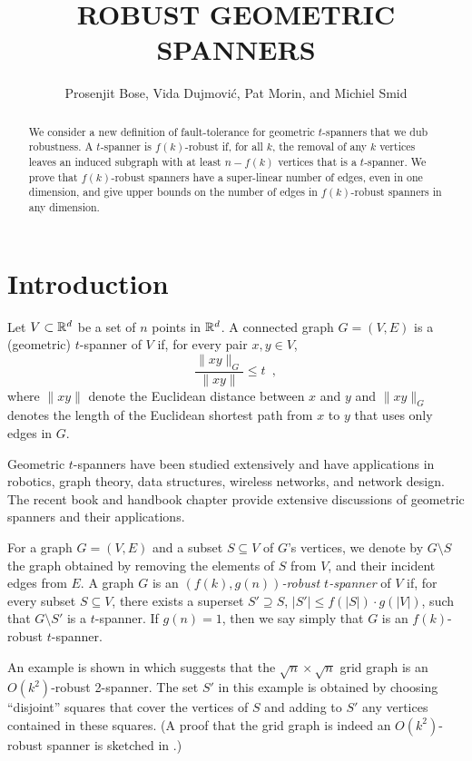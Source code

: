 \documentclass{patmorin}
\title{\MakeUppercase{Robust Geometric Spanners}}
\author{Prosenjit Bose, Vida Dujmovi\'c, Pat Morin, and Michiel Smid}
\begin{document}
\maketitle

\begin{abstract}
  We consider a new definition of fault-tolerance for geometric
  $t$-spanners that we dub robustness.  A $t$-spanner is $f(k)$-robust
  if, for all $k$, the removal of any $k$ vertices leaves an induced
  subgraph with at least $n-f(k)$ vertices that is a $t$-spanner.
  We prove that $f(k)$-robust spanners have a super-linear number of
  edges, even in one dimension, and give upper bounds on the number of
  edges in $f(k)$-robust spanners in any dimension.
\end{abstract}

\section{Introduction}

Let $V\subset \mathbb{R}^d$ be a set of $n$ points in $\mathbb{R}^d$.  A connected
graph $G=(V,E)$ is a (geometric) $t$-spanner of $V$ if, for every pair
$x,y\in V$,
\[
  \frac{\|xy\|_G}{\|xy\|} \le t \enspace ,
\]
where $\|xy\|$ denote the Euclidean distance between $x$ and $y$ and
$\|xy\|_G$ denotes the length of the Euclidean shortest path from $x$
to $y$ that uses only edges in $G$.

Geometric $t$-spanners have been studied extensively and have applications
in robotics, graph theory, data structures, wireless networks, and
network design.  The recent book \cite{ns07} and handbook chapter
\cite{e99} provide extensive discussions of geometric spanners and
their applications.

For a graph $G=(V,E)$ and a subset $S\subseteq V$ of $G$'s vertices,
we denote by $G\setminus S$ the graph obtained by removing the elements
of $S$ from $V$, and their incident edges from $E$.  A graph $G$ is an
\emph{$(f(k),g(n))$-robust $t$-spanner} of $V$ if, for every subset
$S\subseteq V$, there exists a superset $S'\supseteq S$, $|S'|\le
f(|S|)\cdot g(|V|)$, such that $G\setminus S'$ is a $t$-spanner.
If $g(n)=1$, then we say simply that $G$ is an $f(k)$-robust $t$-spanner.

An example is shown in  which suggests that the
$\sqrt{n}\times\sqrt{n}$ grid graph is an $O(k^2)$-robust 2-spanner.
The set $S'$ in this example is obtained by choosing ``disjoint''
squares that cover the vertices of $S$ and adding to $S'$ any vertices
contained in these squares.  (A proof that the grid graph is indeed an
$O(k^2)$-robust spanner is sketched in .)
\end{document}
